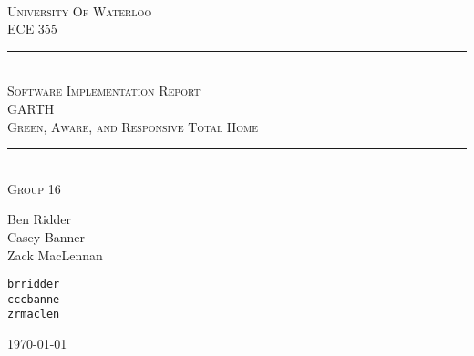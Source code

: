 \begin{titlepage}
\begin{center}
\vfill
\hfill
\\[2cm]
\textsc{\LARGE University Of Waterloo}
\\[1cm]
\textsc{\LARGE ECE 355}
\\[2cm]

\hrule
\hfill
\\[0.5cm]
\textsc{\huge Software Implementation Report}
\\[0.5cm]
\textsc{\huge GARTH}
\\[0.5cm]
\textsc{\huge Green, Aware, and Responsive Total Home}
\\[0.5cm]
\hrule
\hfill
\\[1cm]
\textsc{\LARGE Group 16} \\[0.4cm]

\begin{minipage}{0.4\textwidth}
\begin{flushleft} \large
Ben Ridder \\
Casey Banner \\
Zack MacLennan
\end{flushleft}
\end{minipage}
\begin{minipage}{0.4\textwidth}
\begin{flushright} \large
\texttt{brridder} \\
\texttt{cccbanne} \\
\texttt{zrmaclen}
\end{flushright}
\end{minipage}


\vfill

{\large \today}
\end{center}
\end{titlepage}

